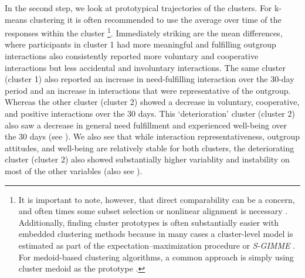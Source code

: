 In the second step, we look at prototypical trajectories of the
clusters. For k-means clustering it is often recommended to use the
average over time of the responses within the cluster
\citep[see ;][]{niennattrakul2007}\footnote{It is important to note, however, that direct comparability can be a concern, and often times some subset selection or nonlinear alignment is necessary \citep[e.g.,][]{gupta1996}. Additionally, finding cluster prototypes is often substantially easier with embedded clustering methods because in many cases a cluster-level model is estimated as part of the expectation–maximization procedure \citep[e.g.,][]{denteuling2021} or \textit{S-GIMME} \citep[e.g.][]{lane2019}. For medoid-based clustering algorithms, a common approach is simply using cluster medoid as the prototype \citep{kaufman1990}.}.
Immediately striking are the mean differences, where participants in
cluster 1 had more meaningful and fulfilling outgroup interactions also
consistently reported more voluntary and cooperative interactions but
less accidental and involuntary interactions. The same cluster (cluster
1) also reported an increase in need-fulfilling interaction over the
30-day period and an increase in interactions that were representative
of the outgroup. Whereas the other cluster (cluster 2) showed a decrease
in voluntary, cooperative, and positive interactions over the 30 days.
This `deterioration' cluster (cluster 2) also saw a decrease in general
need fulfillment and experienced well-being over the 30 days (see
). We also see that while interaction
representativeness, outgroup attitudes, and well-being are relatively
stable for both clusters, the deteriorating cluster (cluster 2) also
showed substantially higher variablity and instability on most of the
other variables (also see ).

